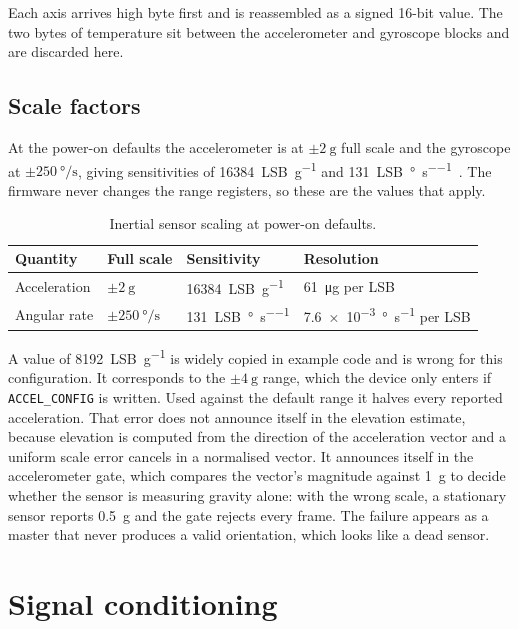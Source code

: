 Each axis arrives high byte first and is reassembled as a signed 16-bit value.
The two bytes of temperature sit between the accelerometer and gyroscope
blocks and are discarded here.

\subsection{Scale factors}

At the power-on defaults the accelerometer is at \(\pm\SI{2}{\gram}\) full
scale and the gyroscope at \(\pm\SI{250}{\degree\per\second}\), giving
sensitivities of \SI{16384}{LSB\per\gram} and
\SI{131}{LSB\per\degree\per\second}~\cite{invensense2013mpu6050}. The firmware
never changes the range registers, so these are the values that apply.

\begin{table}[htbp]
  \centering
  \caption{Inertial sensor scaling at power-on defaults.}
  \label{tab:imuscale}
  \begin{tabular}{@{}llll@{}}
    \toprule
    Quantity & Full scale & Sensitivity & Resolution \\
    \midrule
    Acceleration & $\pm\SI{2}{\gram}$ & \SI{16384}{LSB\per\gram}
      & \SI{61}{\micro\gram} per LSB \\
    Angular rate & $\pm\SI{250}{\degree\per\second}$
      & \SI{131}{LSB\per\degree\per\second}
      & \SI{7.6e-3}{\degree\per\second} per LSB \\
    \bottomrule
  \end{tabular}
\end{table}

A value of \SI{8192}{LSB\per\gram} is widely copied in example code and is
wrong for this configuration. It corresponds to the \(\pm\SI{4}{\gram}\)
range, which the device only enters if \texttt{ACCEL\_CONFIG} is written. Used
against the default range it halves every reported acceleration. That error
does not announce itself in the elevation estimate, because elevation is
computed from the direction of the acceleration vector and a uniform scale
error cancels in a normalised vector. It announces itself in the accelerometer
gate, which compares the vector's magnitude against \SI{1}{\gram} to decide
whether the sensor is measuring gravity alone: with the wrong scale, a
stationary sensor reports \SI{0.5}{\gram} and the gate rejects every frame.
The failure appears as a master that never produces a valid orientation, which
looks like a dead sensor.

\section{Signal conditioning}

